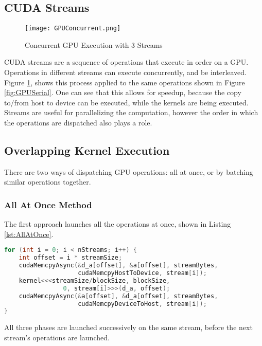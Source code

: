 \subsection{CUDA Streams}
\begin{figure}[t!]
\centering
\texttt{[image: GPUConcurrent.png]}
\caption{Concurrent GPU Execution with 3 Streams}
\label{fig:GPUConcurrent}
\end{figure}
CUDA streams are a sequence of operations that execute in order on a GPU. Operations in different streams can execute concurrently, and be interleaved. Figure \ref{fig:GPUConcurrent}, shows this process applied to the same operations shown in Figure \ref{fig:GPUSerial}. One can see that this allows for speedup, because the copy to/from host to device can be executed, while the kernels are being executed. Streams are useful for parallelizing the computation, however the order in which the operations are dispatched also plays a role.

\subsection{Overlapping Kernel Execution}
There are two ways of dispatching GPU operations: all at once, or by batching similar operations together.

\subsubsection{All At Once Method}
The first approach launches all the operations at once, shown in Listing \ref{lst:AllAtOnce}.
\begin{lstlisting}[language=C++,caption={Operations launched all at once},label={lst:AllAtOnce}]
for (int i = 0; i < nStreams; i++) {
    int offset = i * streamSize;
    cudaMemcpyAsync(&d_a[offset], &a[offset], streamBytes, 
                    cudaMemcpyHostToDevice, stream[i]);
    kernel<<<streamSize/blockSize, blockSize, 
                0, stream[i]>>>(d_a, offset);
    cudaMemcpyAsync(&a[offset], &d_a[offset], streamBytes, 
                    cudaMemcpyDeviceToHost, stream[i]);
}
\end{lstlisting}
All three phases are launched successively on the same stream, before the next stream's operations are launched. 
